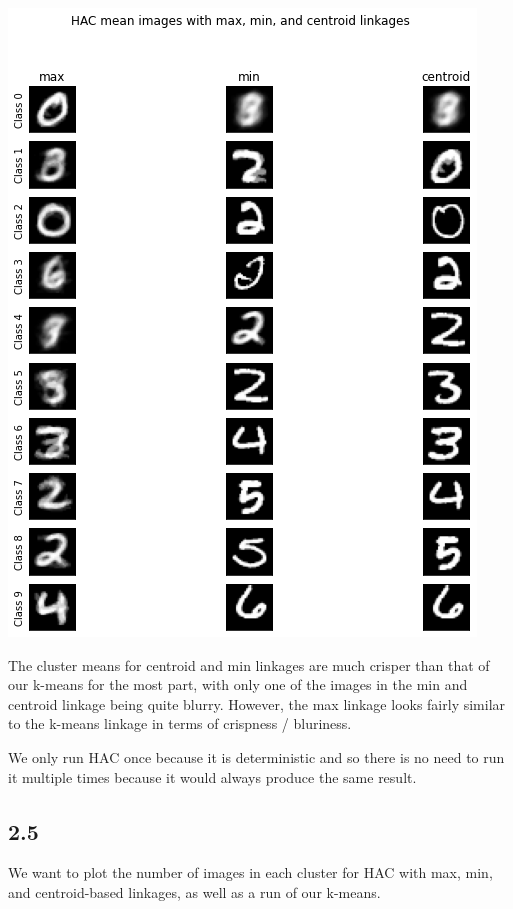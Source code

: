 \documentclass[submit]{harvardml}
\begin{document}
\includegraphics[scale=0.5]{plots/hac.png}

The cluster means for centroid and min linkages are much crisper than that of our k-means for the most part, with only one of the images in the min and centroid linkage being quite blurry. However, the max linkage looks fairly similar to the k-means linkage in terms of crispness / bluriness.

We only run HAC once because it is deterministic and so there is no need to run it multiple times because it would always produce the same result.

\newpage
\subsection*{2.5}

We want to plot the number of images in each cluster for HAC with max, min, and centroid-based linkages, as well as a run of our k-means.
\end{document}
